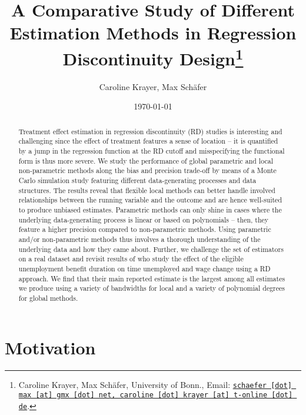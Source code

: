 \documentclass[11pt, a4paper, leqno]{article}
\numberwithin{equation}{section}
\numberwithin{figure}{section}
\numberwithin{table}{section}
\numberwithin{algorithm}{section}
\begin{document}
\title{A Comparative Study of Different Estimation Methods in Regression Discontinuity Design\thanks{Caroline Krayer, Max Schäfer, University of Bonn.,  Email: \href{mailto:schaefer.max@gmx.net, caroline.krayer@t-online.de}{\nolinkurl{schaefer [dot] max [at] gmx [dot] net, caroline [dot] krayer [at] t-online [dot] de}}.}}

\author{Caroline Krayer, Max Schäfer}

\date{\today}

\maketitle


\begin{abstract}

	Treatment effect estimation in regression discontinuity (RD) studies is interesting and challenging since the effect of treatment features a sense of location -- it is quantified by a jump in the regression function at the RD cutoff and misspecifying the functional form is thus more severe. We study the performance of global parametric and local non-parametric methods along the bias and precision trade-off by means of a Monte Carlo simulation study featuring different data-generating processes and data structures. The results reveal that flexible local methods can better handle involved relationships between the running variable and the outcome and are hence well-suited to produce unbiased estimates. Parametric methods can only shine in cases where the underlying data-generating process is linear or based on polynomials -- then, they feature a higher precision compared to non-parametric methods. Using parametric and/or non-parametric methods thus involves a thorough understanding of the underlying data and how they came about. Further, we challenge the set of estimators on a real dataset and revisit results of \cite{nekoei_weber} who study the effect of the eligible unemployment benefit duration on time unemployed and wage change using a RD approach. We find that their main reported estimate is the largest among all estimates we produce using a variety of bandwidths for local and a variety of polynomial degrees for global methods.

\end{abstract}
\thispagestyle{empty}
\addtocounter{page}{-1}
\clearpage

\section{Motivation} %
\label{sec:motivation}
\end{document}
